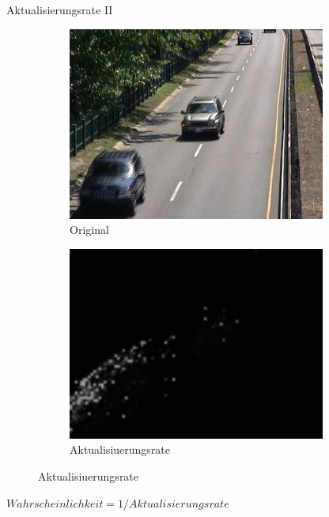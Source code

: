 \documentclass[hyperref={pdfpagelabels=false}]{beamer}
\begin{document}
\begin{frame}{Aktualisierungsrate II}
	\begin{figure}
		\captionsetup[subfigure]{labelformat=empty}
		\begin{subfigure}{.4\linewidth}
			\centering
			\includegraphics[width=\linewidth]{./Bilder/update_bilder/orig1198}
			\caption{Original}
		\end{subfigure}
		\hspace{10mm}
		\begin{subfigure}{.4\linewidth}
			\centering
			\includegraphics[width=\linewidth]{./Bilder/update_bilder/updatearr1198}
			\caption{Aktualisiuerungsrate}
		\end{subfigure}
	\end{figure}
	\vspace{1em}
	\begin{center}
		\Large
		$ Wahrscheinlichkeit = 1/Aktualisierungsrate $
	\end{center}
\end{frame}
\end{document}
